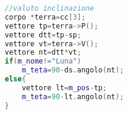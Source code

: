 \begin{lstlisting}[language=C++]
//valuto inclinazione 
corpo *terra=cc[3]; 
vettore tp=terra->P(); 
vettore dtt=tp-sp; 
vettore vt=terra->V(); 
vettore nt=dtt*vt; 
if(m_nome!="Luna") 
    m_teta=90-ds.angolo(nt); 
else{ 
    vettore lt=m_pos-tp; 
    m_teta=90-lt.angolo(nt); 
}
\end{lstlisting}
